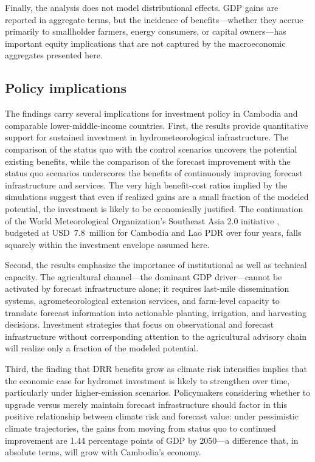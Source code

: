 \documentclass[
  final,
  10pt,
  letterpaper,
  english,
]{article}
\begin{document}
Finally, the analysis does not model distributional effects. GDP gains are
reported in aggregate terms, but the incidence of benefits---whether they accrue
primarily to smallholder farmers, energy consumers, or capital owners---has
important equity implications that are not captured by the macroeconomic
aggregates presented here.


\subsection{Policy implications}
\label{sec:discussion_policy}

The findings carry several implications for investment policy in Cambodia and
comparable lower-middle-income countries. First, the results provide
quantitative support for sustained investment in hydrometeorological
infrastructure. The comparison of the status quo with the control scenarios
uncovers the potential existing benefits, while the comparison of the forecast
improvement with the status quo scenarios underscores the benefits of
continuously improving forecast infrastructure and services. The very high
benefit-cost ratios implied by the simulations suggest that even if realized
gains are a small fraction of the modeled potential, the investment is likely to
be economically justified. The continuation of the World Meteorological
Organization's Southeast Asia 2.0 initiative \parencite{crews2025sea2_project},
budgeted at USD~7.8~million for Cambodia and Lao PDR over four years, falls
squarely within the investment envelope assumed here.

Second, the results emphasize the importance of institutional as well as
technical capacity. The agricultural channel---the dominant GDP driver---cannot be
activated by forecast infrastructure alone; it requires last-mile dissemination
systems, agrometeorological extension services, and farm-level capacity to
translate forecast information into actionable planting, irrigation, and
harvesting decisions. Investment strategies that focus on observational and
forecast infrastructure without corresponding attention to the agricultural
advisory chain will realize only a fraction of the modeled potential.

Third, the finding that DRR benefits grow as climate risk intensifies implies
that the economic case for hydromet investment is likely to strengthen over
time, particularly under higher-emission scenarios. Policymakers considering
whether to upgrade versus merely maintain forecast infrastructure should factor
in this positive relationship between climate risk and forecast value: under
pessimistic climate trajectories, the gains from moving from status quo to
continued improvement are 1.44 percentage points of GDP by 2050---a difference
that, in absolute terms, will grow with Cambodia's economy.
\end{document}
